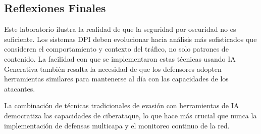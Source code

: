\documentclass[letter,12pt]{article}
\begin{document}
\subsection*{Reflexiones Finales}

Este laboratorio ilustra la realidad de que la seguridad por oscuridad no es suficiente. Los sistemas DPI deben evolucionar hacia análisis más sofisticados que consideren el comportamiento y contexto del tráfico, no solo patrones de contenido. La facilidad con que se implementaron estas técnicas usando IA Generativa también resalta la necesidad de que los defensores adopten herramientas similares para mantenerse al día con las capacidades de los atacantes.

La combinación de técnicas tradicionales de evasión con herramientas de IA democratiza las capacidades de ciberataque, lo que hace más crucial que nunca la implementación de defensas multicapa y el monitoreo continuo de la red.
\end{document}
